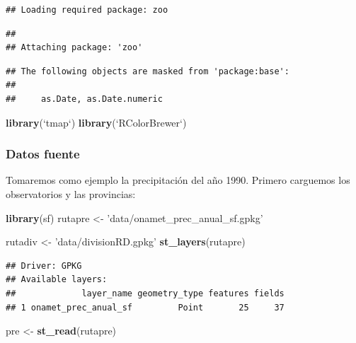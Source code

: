 \documentclass[11pt,]{article}
\newenvironment{Shaded}{\begin{snugshade}}{\end{snugshade}}
\newcommand{\KeywordTok}[1]{\textcolor[rgb]{0.13,0.29,0.53}{\textbf{#1}}}
\newcommand{\DataTypeTok}[1]{\textcolor[rgb]{0.13,0.29,0.53}{#1}}
\newcommand{\StringTok}[1]{\textcolor[rgb]{0.31,0.60,0.02}{#1}}
\newcommand{\NormalTok}[1]{#1}
\begin{document}
\begin{verbatim}
## Loading required package: zoo
\end{verbatim}

\begin{verbatim}
## 
## Attaching package: 'zoo'
\end{verbatim}

\begin{verbatim}
## The following objects are masked from 'package:base':
## 
##     as.Date, as.Date.numeric
\end{verbatim}

\begin{Shaded}
\begin{Highlighting}[]
\KeywordTok{library}\NormalTok{(}\StringTok{`}\DataTypeTok{tmap}\StringTok{`}\NormalTok{)}
\KeywordTok{library}\NormalTok{(}\StringTok{`}\DataTypeTok{RColorBrewer}\StringTok{`}\NormalTok{)}
\end{Highlighting}
\end{Shaded}

\subsubsection{Datos fuente}\label{datos-fuente}

Tomaremos como ejemplo la precipitación del año 1990. Primero carguemos
los observatorios y las provincias:

\begin{Shaded}
\begin{Highlighting}[]
\KeywordTok{library}\NormalTok{(sf)}
\NormalTok{rutapre <-}\StringTok{ 'data/onamet_prec_anual_sf.gpkg'}

\NormalTok{rutadiv <-}\StringTok{ 'data/divisionRD.gpkg'}
\KeywordTok{st_layers}\NormalTok{(rutapre)}
\end{Highlighting}
\end{Shaded}

\begin{verbatim}
## Driver: GPKG 
## Available layers:
##             layer_name geometry_type features fields
## 1 onamet_prec_anual_sf         Point       25     37
\end{verbatim}

\begin{Shaded}
\begin{Highlighting}[]
\NormalTok{pre <-}\StringTok{ }\KeywordTok{st_read}\NormalTok{(rutapre)}
\end{Highlighting}
\end{Shaded}
\end{document}
